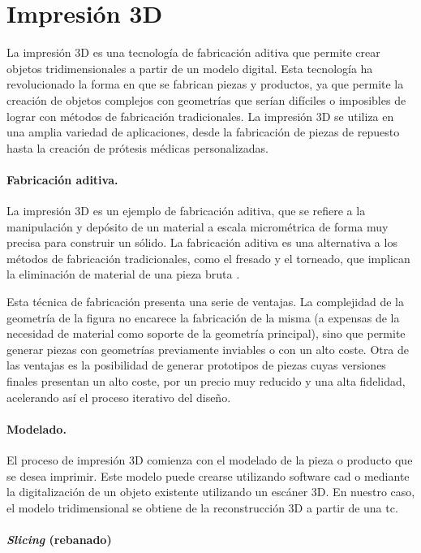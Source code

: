 \section{Impresión 3D}

La impresión 3D es una tecnología de fabricación aditiva que permite crear objetos tridimensionales a partir de un modelo digital. Esta tecnología ha revolucionado la forma en que se fabrican piezas y productos, ya que permite la creación de objetos complejos con geometrías que serían difíciles o imposibles de lograr con métodos de fabricación tradicionales. La impresión 3D se utiliza en una amplia variedad de aplicaciones, desde la fabricación de piezas de repuesto hasta la creación de prótesis médicas personalizadas.

\paragraph{Fabricación aditiva.}
La impresión 3D es un ejemplo de fabricación aditiva, que se refiere a la manipulación y depósito de un material a escala micrométrica de forma muy precisa para construir un sólido. La fabricación aditiva es una alternativa a los métodos de fabricación tradicionales, como el fresado y el torneado, que implican la eliminación de material de una pieza bruta \cite{zahera2012fabricacion}.

Esta técnica de fabricación presenta una serie de ventajas. La complejidad de la geometría de la figura no encarece la fabricación de la misma (a expensas de la necesidad de material como soporte de la geometría principal), sino que permite generar piezas con geometrías previamente inviables o con un alto coste.
Otra de las ventajas es la posibilidad de generar prototipos de piezas cuyas versiones finales presentan un alto coste, por un precio muy reducido y una alta fidelidad, acelerando así el proceso iterativo del diseño.

\paragraph{Modelado.}
El proceso de impresión 3D comienza con el modelado de la pieza o producto que se desea imprimir. Este modelo puede crearse utilizando software \gls{cad} o mediante la digitalización de un objeto existente utilizando un escáner 3D. En nuestro caso, el modelo tridimensional se obtiene de la reconstrucción 3D a partir de una \acrshort{tc}.

\paragraph{\emph{Slicing} (rebanado)}


